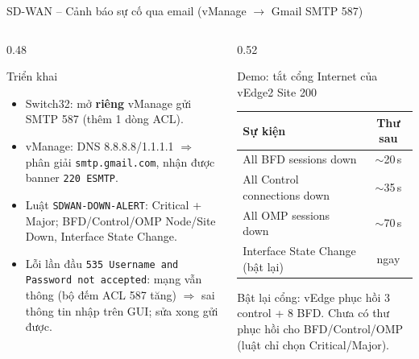 \documentclass[aspectratio=169, 10pt]{beamer}
\begin{document}
\begin{frame}{SD-WAN -- Cảnh báo sự cố qua email (vManage $\rightarrow$ Gmail SMTP 587)}
    \begin{columns}[T]
        \begin{column}{0.48\textwidth}
            \begin{block}{Triển khai}
                \small
                \begin{itemize}
                    \item Switch32: mở \textbf{riêng} vManage gửi SMTP 587 (thêm 1 dòng ACL).
                    \item vManage: DNS 8.8.8.8/1.1.1.1 $\Rightarrow$ phân giải \texttt{smtp.gmail.com},
                          nhận được banner \texttt{220 ESMTP}.
                    \item Luật \texttt{SDWAN-DOWN-ALERT}: Critical + Major; BFD/Control/OMP Node/Site Down,
                          Interface State Change.
                    \item Lỗi lần đầu \texttt{535 Username and Password not accepted}: mạng vẫn thông
                          (bộ đếm ACL 587 tăng) $\Rightarrow$ sai thông tin nhập trên GUI; sửa xong gửi được.
                \end{itemize}
            \end{block}
        \end{column}
        \begin{column}{0.52\textwidth}
            \begin{exampleblock}{Demo: tắt cổng Internet của vEdge2 Site 200}
                \footnotesize
                \centering
                \begin{tabular}{@{}lc@{}}
                    \toprule
                    \textbf{Sự kiện} & \textbf{Thư sau} \\
                    \midrule
                    All BFD sessions down      & $\sim$20\,s \\
                    All Control connections down & $\sim$35\,s \\
                    All OMP sessions down      & $\sim$70\,s \\
                    Interface State Change (bật lại) & ngay \\
                    \bottomrule
                \end{tabular}
            \end{exampleblock}
            \scriptsize Bật lại cổng: vEdge phục hồi 3 control + 8 BFD. Chưa có thư phục hồi cho BFD/Control/OMP
            (luật chỉ chọn Critical/Major).
        \end{column}
    \end{columns}
\end{frame}
\end{document}
